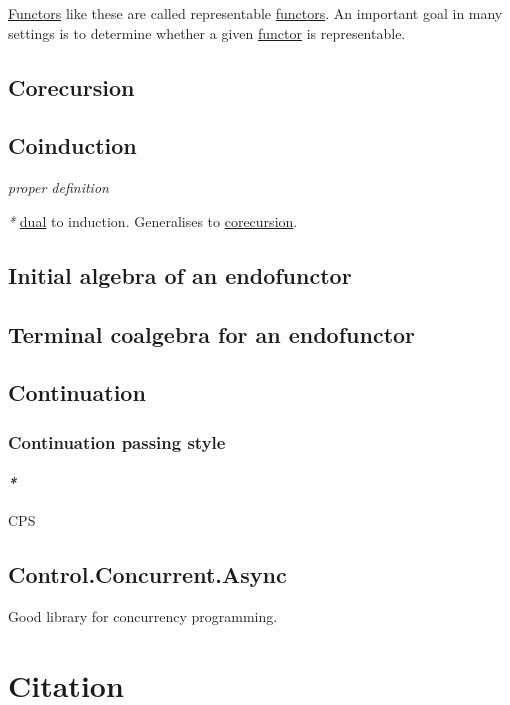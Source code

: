 \documentclass[a4paper,14pt,oneside]{book}
\begin{document}
\hyperref[org1c356b0]{Functors} like these are called representable \hyperref[org1c356b0]{functors}. An important goal in many settings is to determine whether a given \hyperref[org2393026]{functor} is representable.

\chapter{\label{orgdab0889}Corecursion}
\label{sec:org5b0c7c6}
\chapter{\label{org915546a}Coinduction}
\label{sec:orgdf91b61}

\emph{proper definition}

\emph{*} \hyperref[org42a1f59]{dual} to induction.
Generalises to \hyperref[orgdab0889]{corecursion}.

\chapter{\label{orgbbb8da9}Initial algebra of an endofunctor}
\label{sec:orge71545b}
\chapter{\label{org0567c12}Terminal coalgebra for an endofunctor}
\label{sec:orgd942703}
\chapter{Continuation}
\label{sec:orgf3c55f0}
\section{Continuation passing style}
\label{sec:orgecb4091}

\subsection{\emph{*}}
\label{sec:orge5b122a}

CPS

\chapter{Control.Concurrent.Async}
\label{sec:org706bbc3}

Good library for concurrency programming.

\part{Citation}
\label{sec:org1762d22}
\end{document}
